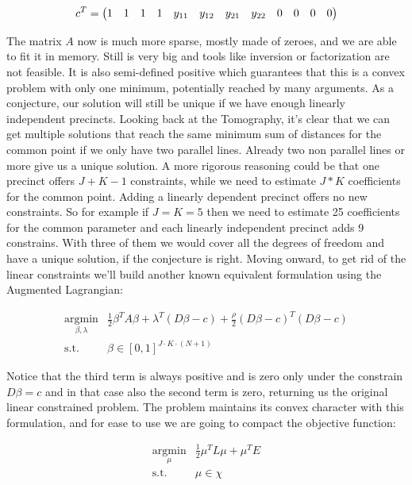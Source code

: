 \documentclass{article}
\begin{document}
\begin{equation*}
\setcounter{MaxMatrixCols}{20}
c^T=\begin{pmatrix}
1&1&1&1&y_{11}&y_{12}&y_{21}&y_{22}&0&0&0&0
\end{pmatrix}
\end{equation*}

The matrix $A$ now is much more sparse, mostly made of zeroes, and we are able to fit it in memory. Still is very big and tools like inversion or factorization are not feasible. It is also semi-defined positive which guarantees that this is a convex problem with only one minimum, potentially reached by many arguments. As a conjecture, our solution will still be unique if we have enough linearly independent precincts. Looking back at the Tomography, it's clear that we can get multiple solutions that reach the same minimum sum of distances for the common point if we only have two parallel lines. Already two non parallel lines or more give us a unique solution. A more rigorous reasoning could be that one precinct offers $J+K-1$ constraints, while we need to estimate $J*K$ coefficients for the common point. Adding a linearly dependent precinct offers no new constraints. So for example if $J=K=5$ then we need to estimate 25 coefficients for the common parameter and each linearly independent precinct adds 9 constrains. With three of them we would cover all the degrees of freedom and have a unique solution, if the conjecture is right.
Moving onward, to get rid of the linear constraints we'll build another known equivalent formulation using the Augmented Lagrangian:

\begin{align*}
\underset{\beta,\lambda}{\text{arg}\min}& \frac{1}{2}\beta^T A \beta+\lambda^T(D\beta-c)+\frac{\rho}{2}(D\beta-c)^T(D\beta-c)\\
\text{s.t. }&\beta \in [0,1]^{J\cdot K\cdot (N+1)}
\end{align*}

Notice that the third term is always positive and is zero only under the constrain $D\beta=c$ and in that case also the second term is zero, returning us the original linear constrained problem. The problem maintains its convex character with this formulation, and for ease to use we are going to compact the objective function:

\begin{align*}
\underset{\mu}{\text{arg}\min}& \frac{1}{2}\mu^T L \mu+\mu^T E\\
\text{s.t. }&\mu \in \chi
\end{align*}
\end{document}

